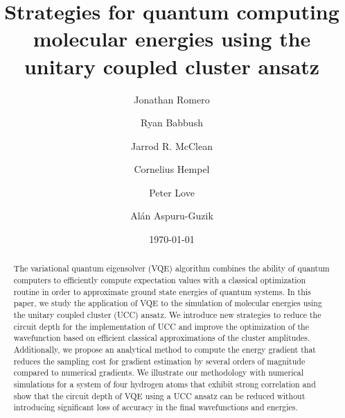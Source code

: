\documentclass[superscriptaddress,aps,pra,twocolumn,nofootinbib,babel]{revtex4-1}
\begin{document}
\title{Strategies for quantum computing molecular energies using the unitary coupled cluster ansatz}

\author{Jonathan Romero}

\author{Ryan Babbush} 

\author{Jarrod R. McClean} 

\author{Cornelius Hempel}

\author{Peter Love}

\author{Al\'an Aspuru-Guzik}

\date{\today}%

\begin{abstract}
The variational quantum eigensolver (VQE) algorithm combines the ability of quantum computers to efficiently compute expectation values with a classical optimization routine in order to approximate ground state energies of quantum systems. In this paper, we study the application of VQE to the simulation of molecular energies using the unitary coupled cluster (UCC) ansatz. We introduce new strategies to reduce the circuit depth for the implementation of UCC and improve the optimization of the wavefunction based on efficient classical approximations of the cluster amplitudes. Additionally, we propose an analytical method to compute the energy gradient that reduces the sampling cost for gradient estimation by several orders of magnitude compared to numerical gradients. We illustrate our methodology with numerical simulations for a system of four hydrogen atoms that exhibit strong correlation and show that the circuit depth of VQE using a UCC ansatz can be reduced without introducing significant loss of accuracy in the final wavefunctions and energies. 
\end{abstract}

\maketitle
\end{document}
